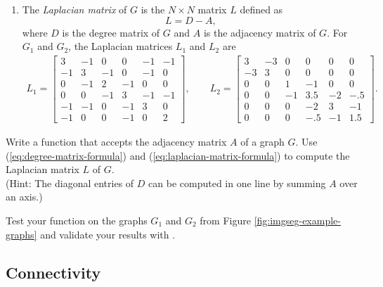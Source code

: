 \begin{enumerate}
\item The \emph{Laplacian matrix} of $G$ is the $N\times N$ matrix $L$ defined as
\begin{equation}
L = D - A,
\label{eq:laplacian-matrix-formula}
\end{equation}
where $D$ is the degree matrix of $G$ and $A$ is the adjacency matrix of $G$.
For $G_1$ and $G_2$, the Laplacian matrices $L_1$ and $L_2$ are
\begin{align*}
L_1 =\left[\begin{array}{rrrrrr}
3 & -1 & 0 & 0 & -1 & -1\\
-1 & 3 & -1 & 0 & -1 & 0\\
0 & -1 & 2 & -1 & 0 & 0\\
0 & 0 & -1 & 3 & -1 & -1\\
-1 & -1 & 0 & -1 & 3& 0\\
-1 & 0 & 0 & -1 & 0 & 2
\end{array}\right],
\qquad L_2 =
 \left[\begin{array}{rrrrrr}
3 & -3 & 0 & 0 & 0 & 0\\
-3 & 3 & 0 & 0 & 0 & 0\\
0 & 0 & 1 & -1 & 0 & 0\\
0 & 0 & -1 & 3.5 & -2 & -.5\\
0 & 0 & 0 & -2 & 3 & -1\\
0 & 0 & 0 &- .5 & -1 & 1.5
\end{array}\right].
\end{align*}
\end{enumerate}

\begin{problem}
Write a function that accepts the adjacency matrix $A$ of a graph $G$.
Use (\ref{eq:degree-matrix-formula}) and (\ref{eq:laplacian-matrix-formula}) to compute the Laplacian matrix $L$ of $G$.
\\(Hint: The diagonal entries of $D$ can be computed in one line by summing $A$ over an axis.)

Test your function on the graphs $G_1$ and $G_2$ from Figure \ref{fig:imgseg-example-graphs} and validate your results with .
\label{prob:imgseg-laplacian}
\end{problem}

\subsection*{Connectivity} %

